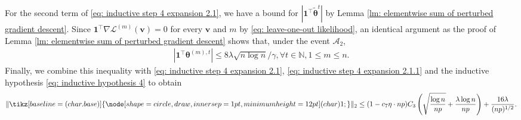 \documentclass[letterpaper,12pt]{article}
\newcommand*\circled[1]{\tikz[baseline=(char.base)]{
		\node[shape=circle, draw, inner sep=1pt, 
	 	minimum height=12pt] (char) {#1};}}
\numberwithin{equation}{section}
\theoremstyle{plain}
\numberwithin{Theorem}{section}
\numberwithin{corollary}{section}
\numberwithin{proposition}{section}
\numberwithin{Lemma}{section}
{
	\theoremstyle{definition}
	\newtheorem{Definition}{Definition}
	\newtheorem{example}{Example}
	\numberwithin{example}{section}
	\newtheorem{fact}{Fact}
	\numberwithin{fact}{section}
	\newtheorem{remark}{Remark}
}
\newcommand{\1}{\mathbbm{1}}
\def\bth{{\boldsymbol{\theta}}}
\begin{document}
	For the second term of \eqref{eq: inductive step 4 expansion 2.1}, we have a bound for $|\bm 1^\top \widetilde\bth^t|$ by Lemma \ref{lm: elementwise sum of perturbed gradient descent}. Since $\bm 1^\top \nabla \mathcal L^{(m)}(\bm v) = 0 $ for every $\bm v$ and $m$ by \eqref{eq: leave-one-out likelihood}, an identical argument as the proof of Lemma \ref{lm: elementwise sum of perturbed gradient descent} shows that, under the event $\mathcal A_2$,
	\begin{align}
		|\bm 1^\top\bth^{(m), t}| \leq 8\lambda\sqrt{n\log n}/\gamma, \forall t \in \mathbb N, 1 \leq m \leq n. \label{eq: inductive step 4 expansion 2.1.2}
	\end{align}
	Finally, we combine this inequality with \eqref{eq: inductive step 4 expansion 2.1}, \eqref{eq: inductive step 4 expansion 2.1.1} and the inductive hypothesis \eqref{eq: inductive hypothesis 4} to obtain
	\begin{align}
		\|\circled{1}\|_2 \leq (1- c_7\eta \cdot np)C_3\left(\sqrt{\frac{\log n}{np}} + \frac{\lambda\log n}{np}\right) + \frac{16\lambda}{(np)^{1/2}}. \label{eq: inductive step 4 expansion 2}
	\end{align}
	
\end{document}
